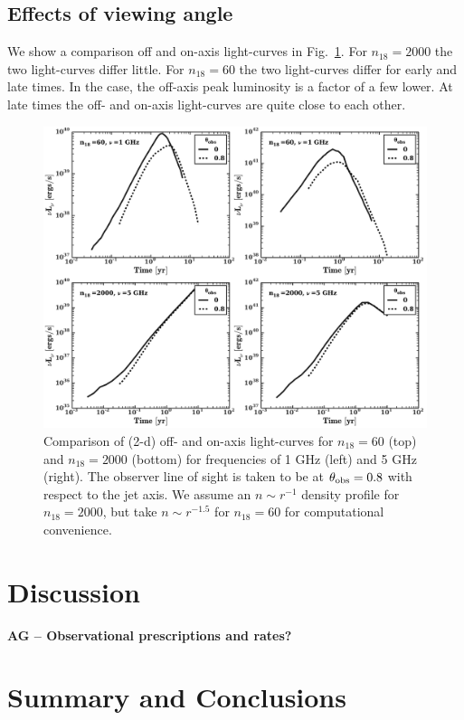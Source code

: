 \documentclass[usenatbib,fleqn]{mnras}
\begin{document}
\subsection{Effects of viewing angle}
We show a comparison off and on-axis light-curves in
Fig.~\ref{fig:onOff}.  For $n_{18}=2000$ the two light-curves differ
little.  For $n_{18}=60$ the two light-curves differ for early and
late times. In the case, the off-axis peak luminosity is a factor of a
few lower. At late times the off- and on-axis light-curves are quite
close to each other.


\begin{figure}
\includegraphics[width=16cm]{on_off.pdf}
\caption{\label{fig:onOff} Comparison of (2-d) off- and on-axis
  light-curves for $n_{18}=60$ (top) and $n_{18}=2000$ (bottom) for
  frequencies of 1 GHz (left) and 5 GHz (right). The observer line of
  sight is taken to be at $\theta_{\rm obs}=0.8$ with respect to the
  jet axis. We assume an $n\sim r^{-1}$ density profile for
  $n_{18}=2000$, but take $n\sim r^{-1.5}$ for $n_{18}=60$ for
  computational convenience.}
\end{figure}


\section{Discussion}
\label{sec:disc}
{\bf AG -- Observational prescriptions and rates?}

\section{Summary and Conclusions}
\label{sec:conc}
\end{document}
